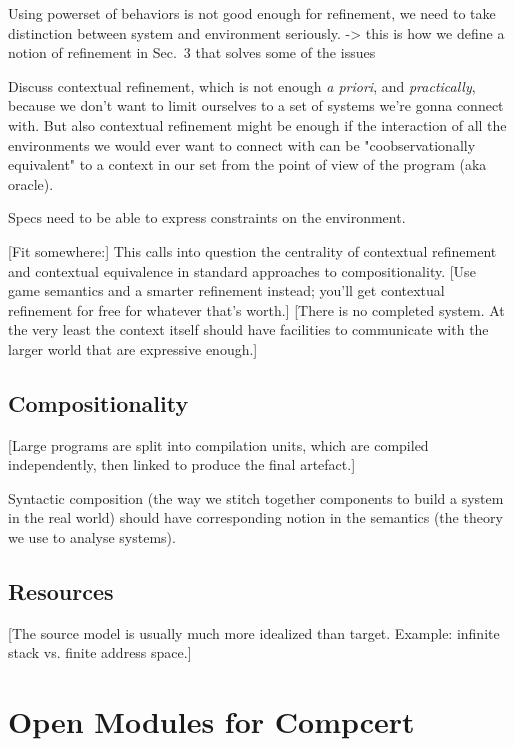\documentclass[sigplan,10pt,review,anonymous]{acmart}
\begin{document}
Using powerset of behaviors is not good enough for refinement,
we need to take distinction between system and environment seriously.
-> this is how we define a notion of refinement in Sec.~3
that solves some of the issues

Discuss contextual refinement,
which is not enough \emph{a priori}, and \emph{practically},
because we don't want to limit ourselves to a set of systems we're gonna connect with.
But also contextual refinement might be enough
if the interaction of all the environments we would ever want to connect with
can be "coobservationally equivalent" to a context in our set
from the point of view of the program (aka oracle).

Specs need to be able to express constraints on the environment.

[Fit somewhere:]
This calls into question
the centrality of contextual refinement and contextual equivalence
in standard approaches to compositionality.
[Use game semantics and a smarter refinement instead;
you'll get contextual refinement for free
for whatever that's worth.]
[There is no completed system.
At the very least the context itself
should have facilities to communicate with the larger world
that are expressive enough.]


\subsection{Compositionality} %

[Large programs are split into compilation units,
which are compiled independently,
then linked to produce the final artefact.]

Syntactic composition
(the way we stitch together components to build a system in the real world)
should have corresponding notion
in the semantics
(the theory we use to analyse systems).


\subsection{Resources} %

[The source model is usually much more idealized than target.
Example: infinite stack vs. finite address space.]



\section{Open Modules for Compcert} %
\end{document}
